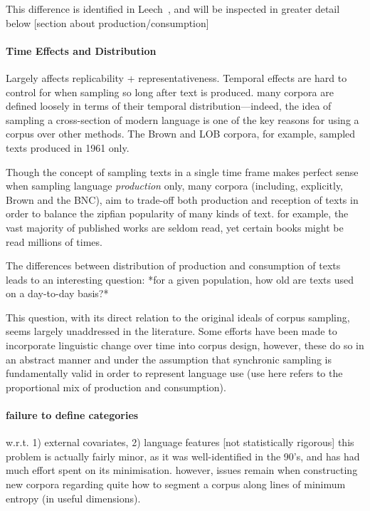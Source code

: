 This difference is identified in Leech~\cite{leech2006new}, and will be inspected in greater detail below [section about production/consumption]









\paragraph{ Time Effects and Distribution }
Largely affects replicability + representativeness. Temporal effects are hard to control for when sampling so long after text is produced. 
many corpora are defined loosely in terms of their temporal distribution---indeed, the idea of sampling a cross-section of modern language is one of the key reasons for using a corpus over other methods. The Brown and LOB corpora, for example, sampled texts produced in 1961 only.

Though the concept of sampling texts in a single time frame makes perfect sense when sampling language \textit{production} only, many corpora (including, explicitly, Brown and the BNC), aim to trade-off both production and reception of texts in order to balance the zipfian popularity of many kinds of text.  for example, the vast majority of published works are seldom read, yet certain books might be read millions of times.

The differences between distribution of production and consumption of texts leads to an interesting question: *for a given population, how old are texts used on a day-to-day basis?*

This question, with its direct relation to the original ideals of corpus sampling, seems largely unaddressed in the literature. Some efforts have been made to incorporate linguistic change over time into corpus design, however, these do so in an abstract manner and under the assumption that synchronic sampling is fundamentally valid in order to represent language use (use here refers to the proportional mix of production and consumption).







\paragraph{ failure to define categories }
w.r.t. 1) external covariates, 2) language features [not statistically rigorous]
this problem is actually fairly minor, as it was well-identified in the 90's, and has had much effort spent on its minimisation.  however, issues remain when constructing new corpora regarding quite how to segment a corpus along lines of minimum entropy (in useful dimensions).

